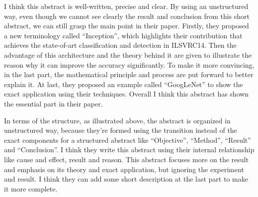\documentclass{article}
\begin{document}
\large{

I think this abstract is well-written, precise and clear. By using an unstructured way, even though we cannot
see clearly the result and conclusion from this short abstract, we can still grasp the main point in their paper.
Firstly, they proposed a new terminology called ``Inception'', which highlights their contribution that achieves
the state-of-art classification and detection in ILSVRC14. Then the advantage of this architecture and the theory
behind it are given to illustrate the reason why it can improve the accuracy significantly. To make it more convincing,
in the last part, the mathematical principle and process are put forward to better explain it. At last, they proposed
an example called ``GoogLeNet'' to show the exact application using their techniques. Overall I think this abstract
has shown the essential part in their paper.

In terms of the structure, as illustrated above, the abstract is organized in unstructured way, because they're formed
using the transition instead of the exact components for a structured abstract like ``Objective'', ``Method'', ``Result''
and ``Conclusion''. I think they write this abstract using their internal relationship like cause and effect, result and
reason. This abstract focuses more on the result and emphasis on its theory and exact application, but ignoring the experiment
and result. I think they can add some short description at the last part to make it more complete.


}
\end{document}

